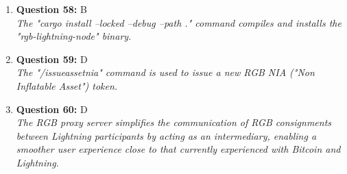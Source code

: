 \documentclass[12pt,a4paper]{article}
\begin{document}
\begin{enumerate}
\item \textbf{Question 58:} B
\\ \textit{The "cargo install --locked --debug --path ." command compiles and installs the "rgb-lightning-node" binary.}

\item \textbf{Question 59:} D
\\ \textit{The "/issueassetnia" command is used to issue a new RGB NIA ("Non Inflatable Asset") token.}

\item \textbf{Question 60:} D
\\ \textit{The RGB proxy server simplifies the communication of RGB consignments between Lightning participants by acting as an intermediary, enabling a smoother user experience close to that currently experienced with Bitcoin and Lightning.}


\end{enumerate}
\end{document}
